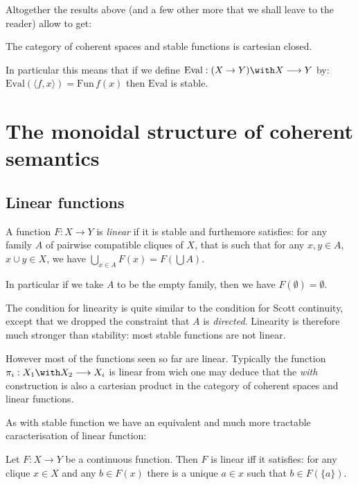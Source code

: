 Altogether the results above (and a few other more that we shall leave
to the reader) allow to get:

\begin{theorem}
The category of coherent spaces and stable functions is cartesian closed.
\end{theorem}

In particular this means that if we define
\(\mathrm{Eval}:(X\imp Y)\with X\longrightarrow Y\) by:
\(\mathrm{Eval}(\langle f, x\rangle) = \mathrm{Fun}\,f(x)\) then
\(\mathrm{Eval}\) is stable.

\section{The monoidal structure of coherent semantics}\label{the-monoidal-structure-of-coherent-semantics}

\subsection{Linear functions}\label{linear-functions}

\begin{definition}
A function $F:X\longrightarrow Y$ is \emph{linear} if it is stable and furthemore satisfies: for any family $A$ of pairwise compatible cliques of $X$, that is such that for any $x, y\in A$, $x\cup y\in X$, we have $\bigcup_{x\in A}F(x) = F(\bigcup A)$.
\end{definition}

In particular if we take \(A\) to be the empty family, then we have
\(F(\emptyset) = \emptyset\).

The condition for linearity is quite similar to the condition for Scott
continuity, except that we dropped the constraint that \(A\) is
\emph{directed}. Linearity is therefore much stronger than stability:
most stable functions are not linear.

However most of the functions seen so far are linear. Typically the
function \(\pi_i:X_1\with X_2\longrightarrow X_i\) is linear from wich
one may deduce that the \emph{with} construction is also a cartesian
product in the category of coherent spaces and linear functions.

As with stable function we have an equivalent and much more tractable
caracterisation of linear function:

\begin{theorem}
Let $F:X\longrightarrow Y$ be a continuous function. Then $F$ is linear iff it satisfies: for any clique $x\in X$ and any $b\in F(x)$ there is a unique $a\in x$ such that $b\in F(\{a\})$.
\end{theorem}

